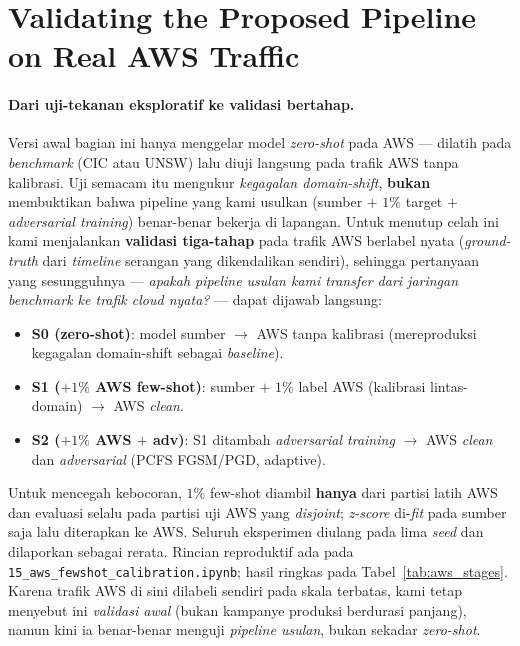 \documentclass[11pt,a4paper]{article}
\begin{document}
\section{Validating the Proposed Pipeline on Real AWS Traffic}
\label{sec:aws}

\paragraph{Dari uji-tekanan eksploratif ke validasi bertahap.} Versi awal bagian ini
hanya menggelar model \emph{zero-shot} pada AWS --- dilatih pada \emph{benchmark}
(CIC atau UNSW) lalu diuji langsung pada trafik AWS tanpa kalibrasi. Uji semacam itu
mengukur \emph{kegagalan domain-shift}, \textbf{bukan} membuktikan bahwa pipeline
yang kami usulkan (sumber $+$ $1\%$ target $+$ \emph{adversarial training})
benar-benar bekerja di lapangan. Untuk menutup celah ini kami menjalankan
\textbf{validasi tiga-tahap} pada trafik AWS berlabel nyata (\emph{ground-truth} dari
\emph{timeline} serangan yang dikendalikan sendiri), sehingga pertanyaan yang
sesungguhnya --- \emph{apakah pipeline usulan kami transfer dari jaringan benchmark ke
trafik cloud nyata?} --- dapat dijawab langsung:
\begin{itemize}
  \item \textbf{S0 (zero-shot)}: model sumber $\rightarrow$ AWS tanpa kalibrasi
  (mereproduksi kegagalan domain-shift sebagai \emph{baseline}).
  \item \textbf{S1 ($+1\%$ AWS few-shot)}: sumber $+$ $1\%$ label AWS
  (kalibrasi lintas-domain) $\rightarrow$ AWS \emph{clean}.
  \item \textbf{S2 ($+1\%$ AWS $+$ adv)}: S1 ditambah \emph{adversarial training}
  $\rightarrow$ AWS \emph{clean} dan \emph{adversarial} (PCFS FGSM/PGD, adaptive).
\end{itemize}
Untuk mencegah kebocoran, $1\%$ few-shot diambil \textbf{hanya} dari partisi latih
AWS dan evaluasi selalu pada partisi uji AWS yang \emph{disjoint}; \emph{z-score}
di-\emph{fit} pada sumber saja lalu diterapkan ke AWS. Seluruh eksperimen diulang
pada lima \emph{seed} dan dilaporkan sebagai rerata. Rincian reproduktif ada pada
\texttt{15\_aws\_fewshot\_calibration.ipynb}; hasil ringkas pada
Tabel~\ref{tab:aws_stages}. Karena trafik AWS di sini dilabeli sendiri pada skala
terbatas, kami tetap menyebut ini \emph{validasi awal} (bukan kampanye produksi
berdurasi panjang), namun kini ia benar-benar menguji \emph{pipeline usulan}, bukan
sekadar \emph{zero-shot}.
\end{document}
